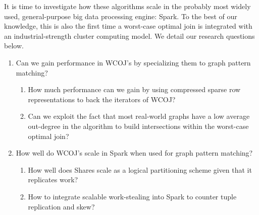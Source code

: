 It is time to investigate how these algorithms scale in the probably most widely used, general-purpose big data processing engine: Spark.
To the best of our knowledge, this is also the first time a worst-case optimal join is integrated with an industrial-strength cluster
computing model.
We detail our research questions below.
\begin{enumerate}
    \item Can we gain performance in \textsc{WCOJ}’s by specializing them to graph pattern matching?
    \begin{enumerate}
        \item How much performance can we gain by using compressed sparse row representations to back the iterators of \textsc{WCOJ}?
        \item Can we exploit the fact that most real-world graphs have a low average out-degree
        in the algorithm to build intersections within the worst-case optimal join?
    \end{enumerate}
    \item How well do \textsc{WCOJ}’s scale in Spark when used for graph pattern matching?
    \begin{enumerate}
        \item How well does Shares scale as a logical partitioning scheme given that it replicates work?
        \item How to integrate scalable work-stealing into Spark to counter tuple replication and skew?
    \end{enumerate}
\end{enumerate}

